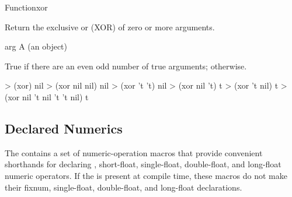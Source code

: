 \documentclass[10pt,twoside,english,pdftex]{article}
\begin{document}

\begin{functiondoc}{Function}{xor}{  
   \returns{} }

\fnsyntax

\fnpurpose Return the exclusive or (XOR) of zero or more arguments.

\fnpackage {}

\fnmodule {}

\fnargs
\begin{args}{arg}
\arg[arg] A  (an object)
\end{args}

\fnreturns True if there are an even odd number of true arguments; \nil{}
otherwise.

\fnexamples
%
\W\supp
\begin{example}
> (xor)
nil
> (xor nil nil)
nil
> (xor 't 't)
nil\goodpagebreak
> (xor nil 't)
t
> (xor 't nil)
t
> (xor nil 't nil 't 't nil)
t
\end{example}

\end{functiondoc}


\W\renewcommand{\subsubentities}{1}

\T\markright{}%
\T\pagestyle{plain}
\T\clearpage
\W{}
\T\pagestyle{fancy}
\T\thispagestyle{fancybottom}
\T\global\def\fnlastname{ }%
\subsection{Declared Numerics}
\label{sec:declared-numerics}%
\label{ent:incfAMP}%

%
%
%
%
%
%
%
%
The   contains a set of
numeric-operation macros that provide convenient shorthands for
declaring , short-float, single-float, double-float, and
long-float numeric operators. If the 
\textbf{} is present at compile time, these
macros do not make their fixnum, single-float, double-float, and long-float
declarations.
\end{document}
